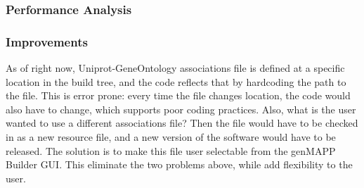 \subsubsection{Performance Analysis}

\subsubsection{Improvements}
As of right now, Uniprot-GeneOntology associations file is defined at a specific location in the build tree,
and the code reflects that by hardcoding the path to the file. This is error prone: every time the file changes location,
the code would also have to change, which supports poor coding practices. Also, what is the user wanted to use a different
associations file? Then the file would have to be checked in as a new resource file, and a new version of the software would have
to be released. The solution is to make this file user selectable from the genMAPP Builder GUI. This eliminate the two problems
above, while add flexibility to the user.
